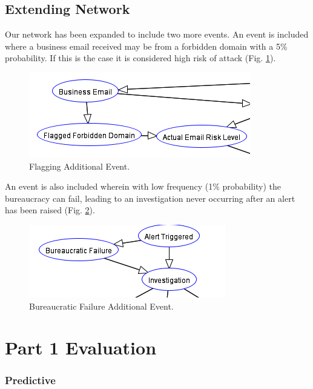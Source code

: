 \documentclass[10pt,a4paper]{article}
\begin{document}

\subsection{Extending Network}

Our network has been expanded to include two more events. An event is included where a business email received may be from a forbidden domain with a 5\% probability. If this is the case it is considered high risk of attack (Fig. \ref{fig:flagged_forbidden}).

\begin{figure}
\centering
  \includegraphics{flagged_forbidden.png}
  \caption{Flagging Additional Event.}
  \label{fig:flagged_forbidden}
\end{figure}

An event is also included wherein with low frequency (1\% probability) the bureaucracy can fail, leading to an investigation never occurring after an alert has been raised (Fig. \ref{fig:bureaucratic_failure}).



\begin{figure}
\centering
  \includegraphics{bureaucratic_failure.png}
  \caption{Bureaucratic Failure Additional Event.}
  \label{fig:bureaucratic_failure}
\end{figure}

\section{Part 1 Evaluation}

\subsubsection{Predictive}
\end{document}
